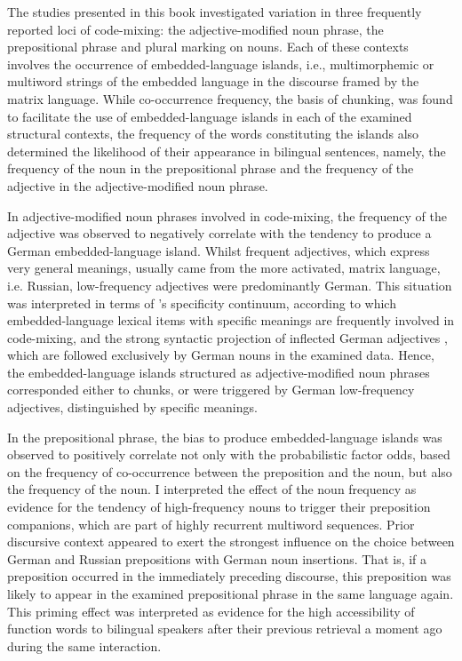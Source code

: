 The studies presented in this book investigated variation in three frequently reported loci of code-mixing: the adjective-modified noun phrase, the prepositional phrase and plural marking on nouns. Each of these contexts involves the occurrence of embedded-language islands, i.e., multimorphemic or multiword strings of the embedded language in the discourse framed by the matrix language. While co-occurrence frequency, the basis of chunking, was found to facilitate the use of embedded-language islands in each of the examined structural contexts, the frequency of the words constituting the islands also determined the likelihood of their appearance in bilingual sentences, namely, the frequency of the noun in the prepositional phrase and the frequency of the adjective in the adjective-modified noun phrase. 

In adjective-modified noun phrases involved in code-mixing, the frequency of the adjective was observed to negatively correlate with the tendency to produce a German embedded-language island. Whilst frequent adjectives, which express very general meanings, usually came from the more activated, matrix language, i.e. Russian, low-frequency adjectives were predominantly German. This situation was interpreted in terms of \citeauthor{backus-2001}'s specificity continuum, according to which embedded-language lexical items with specific meanings are frequently involved in code-mixing, and the strong syntactic projection of inflected German adjectives \citep{auer_projection_2005,auer_syntax_2007}, which are followed exclusively by German nouns in the examined data. Hence, the embedded-language islands structured as adjective-modified noun phrases corresponded either to chunks, or were triggered by German low-frequency adjectives, distinguished by specific meanings. 

In the prepositional phrase, the bias to produce embedded-language islands was observed to positively correlate not only with the probabilistic factor odds, based on the frequency of co-occurrence between the preposition and the noun, but also the frequency of the noun. I interpreted the effect of the noun frequency as evidence for the tendency of high-frequency nouns to trigger their preposition companions, which are part of highly recurrent multiword sequences. Prior discursive context appeared to exert the strongest influence on the choice between German and Russian prepositions with German noun insertions. That is, if a preposition occurred in the immediately preceding discourse, this preposition was likely to appear in the examined prepositional phrase in the same language again. This priming effect was interpreted as evidence for the high accessibility of function words to bilingual speakers after their previous retrieval a moment ago during the same interaction.


